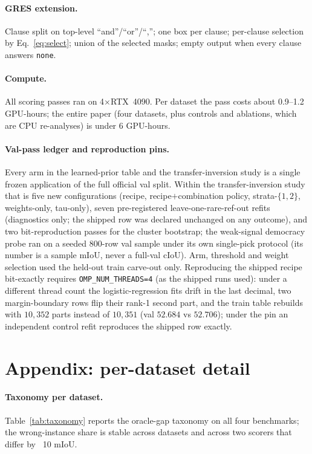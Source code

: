 \paragraph{GRES extension.}
Clause split on top-level ``and''/``or''/``,''; one box per clause; per-clause
selection by Eq.~\ref{eq:select}; union of the selected masks; empty output
when every clause answers \texttt{none}.

\paragraph{Compute.}
All scoring passes ran on 4$\times$RTX~4090. Per dataset the pass costs
about 0.9--1.2 GPU-hours; the entire paper (four datasets, plus controls and
ablations, which are CPU re-analyses) is under 6 GPU-hours.

\paragraph{Val-pass ledger and reproduction pins.}
Every arm in the learned-prior table and the transfer-inversion study is a
single frozen application of the full official val split. Within the
transfer-inversion study that is five new configurations (recipe,
recipe$+$combination policy, strata-$\{1,2\}$, weights-only, tau-only), seven
pre-registered leave-one-rare-ref-out refits (diagnostics only; the shipped
row was declared unchanged on any outcome), and two bit-reproduction passes
for the cluster bootstrap; the weak-signal democracy probe ran on a seeded
$800$-row val sample under its own single-pick protocol (its number is a
sample mIoU, never a full-val cIoU). Arm, threshold and weight selection used
the held-out train carve-out only. Reproducing the shipped recipe bit-exactly
requires \texttt{OMP\_NUM\_THREADS=4} (as the shipped runs used): under a
different thread count the logistic-regression fits drift in the last decimal,
two margin-boundary rows flip their rank-1 second part, and the train table
rebuilds with $10{,}352$ parts instead of $10{,}351$ (val $52.684$ vs
$52.706$); under the pin an independent control refit reproduces the shipped
row exactly.

\section{Appendix: per-dataset detail}
\label{app:detail}

\paragraph{Taxonomy per dataset.}
Table~\ref{tab:taxonomy} reports the oracle-gap taxonomy on all four
benchmarks; the wrong-instance share is stable across datasets and across two
scorers that differ by ~10 mIoU.

